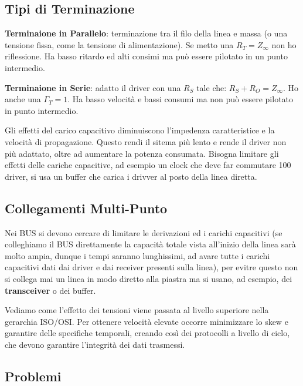 \documentclass[12pt]{article}
\begin{document}
\subsection{Tipi di Terminazione}
\textbf{Terminaione in Parallelo}: terminazione tra il filo della linea e massa (o una tensione fissa, come la tensione di alimentazione). Se metto una $R_T = Z _{\infty}$ non ho riflessione. Ha basso ritardo ed alti consimi ma pu\`o essere pilotato in un punto intermedio.

\textbf{Terminaione in Serie}: adatto il driver con una $R_S$ tale che: $R_S + R_O = Z _{\infty}$. Ho anche una $\Gamma_T = 1$. Ha basso velocit\`a e bassi consumi ma non pu\`o essere pilotato in punto intermedio.

Gli effetti del carico capacitivo diminuiscono l'impedenza caratteristice e la velocit\`a di propagazione. Questo rendi il sitema pi\`u lento e rende il driver non pi\`u adattato, oltre ad aumentare la potenza consumata. Bisogna limitare gli effetti delle cariche capacitive, ad esempio un clock che deve far commutare 100 driver, si usa un buffer che carica i drivver al posto della linea diretta.

\subsection{Collegamenti Multi-Punto}
Nei BUS si devono cercare di limitare le derivazioni ed i carichi capacitivi (se colleghiamo il BUS direttamente la capacit\`a totale vista all'inizio della linea sar\`a molto ampia, dunque i tempi saranno lunghissimi, ad avare tutte i carichi capacitivi dati dai driver e dai receiver presenti sulla linea), per evitre questo non si collega mai un linea in modo diretto alla piastra ma si usano, ad esempio, dei \textbf{transceiver} o dei buffer.

Vediamo come l'effetto dei tensioni viene passata al livello superiore nella gerarchia ISO/OSI. Per ottenere velocit\`a elevate occorre minimizzare lo skew e garantire delle specifiche temporali, creando cos\`i dei protocolli a livello di ciclo, che devono garantire l'integrit\`a dei dati trasmessi.


\subsection{Problemi}
\end{document}
